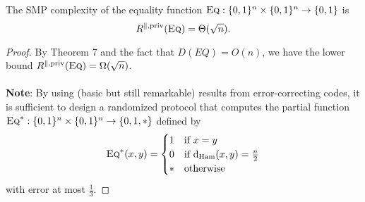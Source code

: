 \begin{theorem}
	The SMP complexity of the equality function $\textsc{Eq} : \{0,1\}^n \times \{0,1\}^n \to \{0,1\}$ is
	\[
	R^{\parallel,\mathrm{priv}}(\textsc{Eq}) = \Theta(\sqrt{n}).
	\]
\end{theorem}

\begin{proof}
	By Theorem 7 and the fact that $D(EQ) = O(n)$, we have the lower bound $R^{\parallel,\mathrm{priv}}(\textsc{Eq}) = \Omega(\sqrt{n})$.\\
	\\
	\textbf{Note}: By using (basic but still remarkable) results from error-correcting codes, it is sufficient to design a randomized protocol that computes the partial function $\textsc{Eq}^* : \{0,1\}^n \times \{0,1\}^n \to \{0,1,*\}$ defined by
	\[
	\textsc{Eq}^*(x,y) = \begin{cases}
	1 & \mbox{if } x = y \\
	0 & \mbox{if } \mathrm{d}_{\mathrm{Ham}}(x,y) = \frac n2 \\
	* & \mbox{otherwise}
	\end{cases}
	\]
	with error at most $\frac13$.
	
\end{proof}